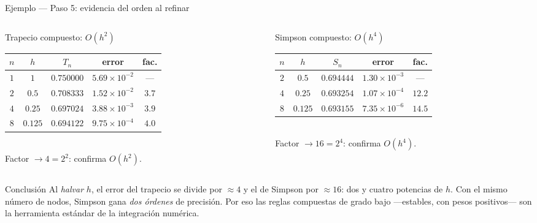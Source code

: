 \documentclass[aspectratio=169,10pt]{beamer}
\begin{document}
\begin{frame}{Ejemplo — Paso 5: evidencia del orden al refinar}
\begin{columns}[T]
\begin{column}{0.49\textwidth}
\begin{cardgear}{Trapecio compuesto: $O(h^2)$}{\faTable}
\centering
{\footnotesize\renewcommand{\arraystretch}{1.32}\setlength{\tabcolsep}{6pt}
\begin{tabular}{c|c|c|cc}
$n$ & $h$ & $T_n$ & error & fac.\\\hline
$1$ & $1$ & $0.750000$ & $5.69{\times}10^{-2}$ & —\\
$2$ & $0.5$ & $0.708333$ & $1.52{\times}10^{-2}$ & $3.7$\\
$4$ & $0.25$ & $0.697024$ & $3.88{\times}10^{-3}$ & $3.9$\\
$8$ & $0.125$ & $0.694122$ & $9.75{\times}10^{-4}$ & $4.0$\\
\end{tabular}}\\[1.2mm]
{\footnotesize Factor $\to4=2^2$: confirma $O(h^2)$.}
\end{cardgear}
\end{column}
\begin{column}{0.49\textwidth}
\begin{cardgear}{Simpson compuesto: $O(h^4)$}{\faTable}
\centering
{\footnotesize\renewcommand{\arraystretch}{1.32}\setlength{\tabcolsep}{6pt}
\begin{tabular}{c|c|c|cc}
$n$ & $h$ & $S_n$ & error & fac.\\\hline
$2$ & $0.5$ & $0.694444$ & $1.30{\times}10^{-3}$ & —\\
$4$ & $0.25$ & $0.693254$ & $1.07{\times}10^{-4}$ & $12.2$\\
$8$ & $0.125$ & $0.693155$ & $7.35{\times}10^{-6}$ & $14.5$\\
\end{tabular}}\\[1.2mm]
{\footnotesize Factor $\to16=2^4$: confirma $O(h^4)$.}
\end{cardgear}
\end{column}
\end{columns}
\vspace{2mm}
\begin{cardidea}{Conclusión}{\faLightbulb}
{\footnotesize Al \emph{halvar} $h$, el error del trapecio se divide por $\approx4$ y el de Simpson por $\approx16$: dos y cuatro potencias de $h$. Con el mismo número de nodos, Simpson gana \emph{dos órdenes} de precisión. Por eso las reglas compuestas de grado bajo —estables, con pesos positivos— son la herramienta estándar de la integración numérica.}
\end{cardidea}
\end{frame}
\end{document}
